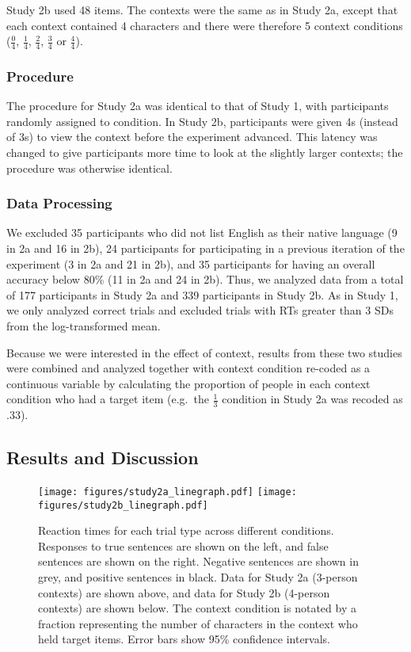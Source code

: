 \documentclass[man]{apa2}
\begin{document}
Study 2b used 48 items.  The contexts were the same as in Study 2a, except that each context contained 4 characters and there were therefore 5 context conditions ($\frac{0}{4}$, $\frac{1}{4}$, $\frac{2}{4}$, $\frac{3}{4}$ or $\frac{4}{4}$).  

\subsubsection{Procedure}
 The procedure for Study 2a was identical to that of Study 1, with participants randomly assigned to condition.   In Study 2b, participants were given 4s (instead of 3s) to view the context before the experiment advanced.  This latency was changed to give participants more time to look at the slightly larger contexts; the procedure was otherwise identical.
 
 \subsubsection{Data Processing}
We excluded 35 participants who did not list English as their native language (9 in 2a and 16 in 2b), 24 participants for participating in a previous iteration of the experiment (3 in 2a and 21 in 2b), and 35 participants for having an overall accuracy below 80\% (11 in 2a and 24 in 2b).  Thus, we analyzed data from a total of 177 participants in Study 2a and 339 participants in Study 2b. As in Study 1, we only analyzed correct trials and excluded trials with RTs greater than 3 SDs from the log-transformed mean. 

Because we were interested in the effect of context, results from these two studies were combined and analyzed together with context condition re-coded as a continuous variable by calculating the proportion of people in each context condition who had a target item (e.g.\ the $\frac{1}{3}$ condition in Study 2a was recoded as .33). 

\subsection{Results and Discussion}

\begin{figure}[t]
\begin{center} 
\texttt{[image: figures/study2a\_linegraph.pdf]}
\texttt{[image: figures/study2b\_linegraph.pdf]}
\caption{\label{fig:e2line} Reaction times for each trial type across different conditions. Responses to true sentences are shown on the left, and false sentences are shown on the right.  Negative sentences are shown in grey, and positive sentences in black.  Data for Study 2a (3-person contexts) are shown above, and data for Study 2b (4-person contexts) are shown below.  The context condition is notated by a fraction representing the number of characters in the context who held target items. Error bars show 95\% confidence intervals.  }
\end{center} 
\end{figure}
\end{document}
